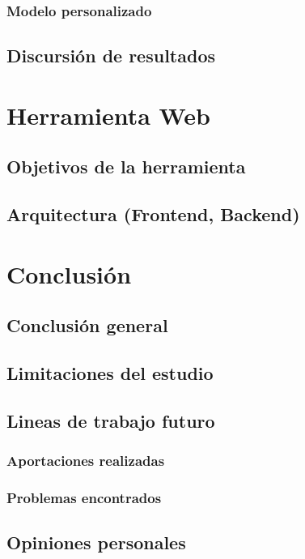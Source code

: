 \documentclass[12pt,a4paper,onecolumn,oneside]{report}
\begin{document}
\subsection{Modelo personalizado}

\section{Discursión de resultados}

\chapter{Herramienta Web}
\section{Objetivos de la herramienta}
\section{Arquitectura (Frontend, Backend)}

\chapter{Conclusión}
\section{Conclusión general}
\section{Limitaciones del estudio}
\section{Lineas de trabajo futuro}

\subsection*{Aportaciones realizadas}



\subsection*{Problemas encontrados}


\section*{Opiniones personales}
\end{document}
